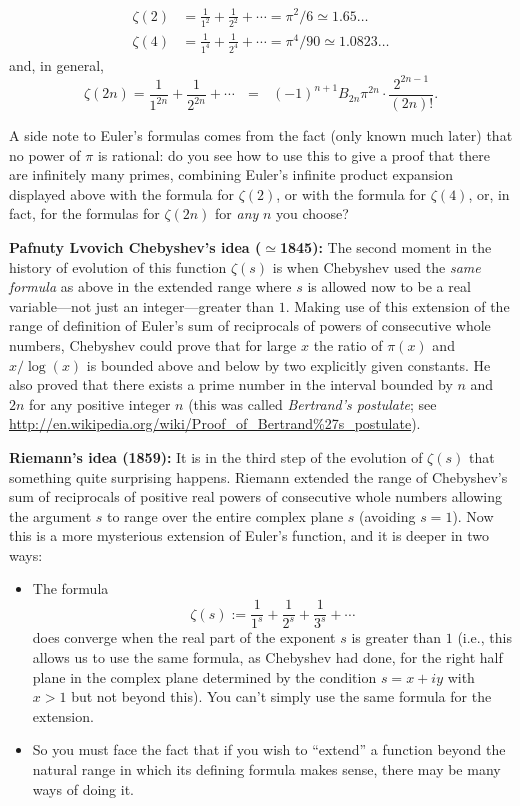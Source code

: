\documentclass[openany]{book}
\theoremstyle{plain}
\theoremstyle{definition}
\begin{document}
{{\begin{align*}
\zeta(2) &= {\frac{1}{1^2}}+{\frac{1}{2^2}}+\cdots = \pi^2/6 \simeq 1.65\dots\\
\zeta(4) &= {\frac{1}{1^4}}+{\frac{1}{2^4}}+\cdots = \pi^4/90\simeq 1.0823\dots
\end{align*}
and, in general,
  $$\zeta(2n) = {\frac{1}{1^{2n}}}+{\frac{1}{2^{2n}}}+\cdots \ \ \ = \ \ \ (-1)^{n+1}B_{2n}\pi^{2n}\cdot {\frac{2^{2n-1}}{(2n)!}}.$$

  A side note to Euler's formulas comes from the fact (only known much
  later) that no power of $\pi$ is rational: do you see how to use
  this to give a proof that there are infinitely many primes,
  combining Euler's infinite product expansion displayed above with
  the formula for $\zeta(2)$, or with the formula for $\zeta(4)$, or,
  in fact, for the formulas for $\zeta(2n)$ for {\it any} $n$ you
  choose?

  {\bf Pafnuty Lvovich Chebyshev's idea ($\simeq$1845):} The second moment
  in the history of evolution of this function $\zeta(s)$ is when
  Chebyshev used the {\it same formula} as above in the extended range
  where $s$ is allowed now to be a real variable---not just an
  integer---greater than $1$.  Making use of this extension of the
  range of definition of Euler's sum of reciprocals of powers of
  consecutive whole numbers, Chebyshev could prove that for large $x$
  the ratio of $\pi(x)$ and $x/\log(x)$ is bounded above and below by
  two explicitly given constants. He also proved that there exists a
  prime number in the interval bounded by $n$ and $2n$ for any positive
  integer $n$ (this was called {\it Bertrand's postulate}; see \url{http://en.wikipedia.org/wiki/Proof_of_Bertrand%27s_postulate}).
  \vskip20pt

  {\bf Riemann's idea (1859):} It is in the third step of the
  evolution of $\zeta(s)$ that something quite surprising
  happens. Riemann extended the range of Chebyshev's sum of
  reciprocals of positive real powers of consecutive whole numbers
  allowing the argument $s$ to range over the entire complex plane $s$
  (avoiding $s=1$).  Now this is a more mysterious extension of
  Euler's function, and it is deeper in two ways:

\begin{itemize}
\item The formula $$\zeta(s):= {\frac{1}{1^s}}+ {\frac{1}{2^s}}+
  {\frac{1}{3^s}}+ \cdots$$ does converge when the real part of the
  exponent $s$ is greater than $1$ (i.e., this allows us to use the
  same formula, as Chebyshev had done, for the right half plane
  in the complex plane determined by the condition $s=x+iy$ with $x>1$
  but not beyond this).  You can't simply use the same formula for the
  extension.\item So you must face the fact that if you wish to
  ``extend'' a function beyond the natural range in which its defining
  formula makes sense, there may be many ways of doing it.
\end{itemize}

}}
\end{document}
